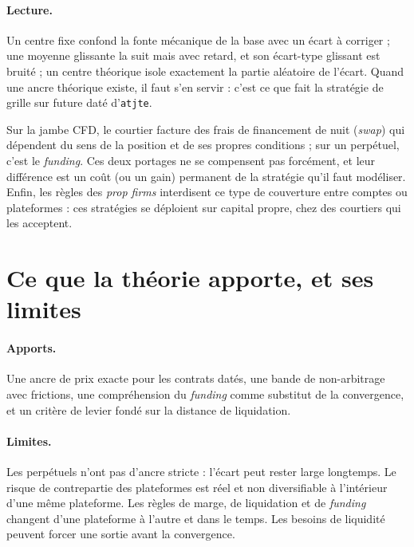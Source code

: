 \paragraph{Lecture.} Un centre fixe confond la fonte mécanique de la base avec un écart à corriger ; une moyenne glissante la suit mais avec retard, et son écart-type glissant est bruité ; un centre théorique isole exactement la partie aléatoire de l'écart. Quand une ancre théorique existe, il faut s'en servir : c'est ce que fait la stratégie de grille sur future daté d'\texttt{atjte}.

\begin{pitfall}
Sur la jambe CFD, le courtier facture des frais de financement de nuit (\emph{swap}) qui dépendent du sens de la position et de ses propres conditions ; sur un perpétuel, c'est le \emph{funding}. Ces deux portages ne se compensent pas forcément, et leur différence est un coût (ou un gain) permanent de la stratégie qu'il faut modéliser. Enfin, les règles des \emph{prop firms} interdisent ce type de couverture entre comptes ou plateformes : ces stratégies se déploient sur capital propre, chez des courtiers qui les acceptent.
\end{pitfall}

\section{Ce que la théorie apporte, et ses limites}

\paragraph{Apports.} Une ancre de prix exacte pour les contrats datés, une bande de non-arbitrage avec frictions, une compréhension du \emph{funding} comme substitut de la convergence, et un critère de levier fondé sur la distance de liquidation.

\paragraph{Limites.} Les perpétuels n'ont pas d'ancre stricte : l'écart peut rester large longtemps. Le risque de contrepartie des plateformes est réel et non diversifiable à l'intérieur d'une même plateforme. Les règles de marge, de liquidation et de \emph{funding} changent d'une plateforme à l'autre et dans le temps. Les besoins de liquidité peuvent forcer une sortie avant la convergence.

